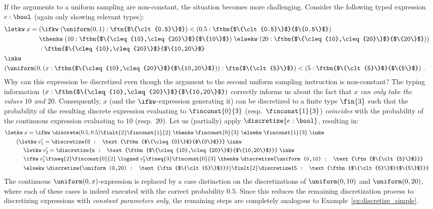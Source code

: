 %
\begin{example}
	If the arguments to a uniform sampling are non-constant, the situation becomes more challenging. Consider the following typed expression $e : \bool$ (again only showing relevant types):
	\begin{align*}
		&\letkw\; x =  (\ifkw \; 
		(\uniform(0, 1) : \text{\ftn{$\{\clt{0.5}\}$}} )
		< (0.5 :\text{\ftbn{$\{\clt{0.5}\}$}{$\{0.5\}$}}) \; \\
		&\phantom{\letkw\; x ={} } \thenkw \; (10 : \text{\ftbn{$\{\cleq{10},\cleq{20}\}$}{$\{10\}$}}) \; 
		\elsekw \; (20 : \text{\ftbn{$\{\cleq{10},\cleq{20}\}$}{$\{20\}$}})) \\
		&\phantom{\letkw\; x ={} } : \text{\ftbn{$\{\cleq{10},\cleq{20}\}$}{$\{10,20\}$}} \\
		&\inkw\; \\
		&(\uniform(0,(x :  \text{\ftbn{$\{\cleq{10},\cleq{20}\}$}{$\{10,20\}$}})) : \text{\ftn{$\{\clt{5}\}$}} ) < (5 :\text{\ftbn{$\{\clt{5}\}$}{$\{5\}$}})~.
	\end{align*}	
	Why can this expression be discretized even though the argument to the second uniform sampling instruction is non-constant? The typing information $(x :  \text{\ftbn{$\{\cleq{10},\cleq{20}\}$}{$\{10,20\}$}})$ correctly informs us about the fact that \emph{$x$ can only take the values $10$ and $20$}. Consequently, $x$ (and the $\ifkw$-expression generating it) can be discretized to a finite type $\fin{3}$ such that the probability of the resulting discrete expression evaluating to $\finconst{0}{3}$ (resp.\ $\finconst{1}{3}$) \emph{coincides} with the probability of the continuous expression evaluating to $10$ (resp.\ $20$). Let us (partially) apply $\discretize{e: \bool}$, resulting in:
	\begin{align*}
		&\letkw \; x = \ifkw\; \discrete(0.5,0.5) \finlt{2} \finconst{1}{2} \; \thenkw \; \finconst{0}{3} \; \elsekw \; \finconst{1}{3} \; \inkw \\
		&\qquad \big(\letkw \; v_1' = \discretize{0 : \text{\ftbn{$\{\cleq{0}\}$}{$\{0\}$}}} \; \inkw \\
		&\qquad\quad\; \letkw \; v_2' = \discretize{x : \text{\ftbn{$\{\cleq{10},\cleq{20}\}$}{$\{10,20\}$}}} \; \inkw \\
		&\qquad\quad\; \ifkw\; v_1' \fineq{2} \finconst{0}{2} \; \logand \; v_2' \fineq{3} \finconst{0}{3} \; \thenkw \; \discretize{\uniform(0,10) : \text{\ftn{$\{\clt{5}\}$}}} \\
		&\qquad\quad\; \elsekw \; \discretize{\uniform(0,20) : \text{\ftn{$\{\clt{5}\}$}}} \big) \finlt{2} \discretize{5 : \text{\ftbn{$\{\clt{5}\}$}{$\{5\}$}}}
	\end{align*}	
	The continuous $\uniform(0,x)$-expression is replaced by a case distinction on the discretizations of $\uniform(0,10)$ and $\uniform(0,20)$, where each of these cases is indeed executed with the correct probability $0.5$. Since this reduces the remaining discretization process to discretizing expressions with \emph{constant parameters only}, the remaining steps are completely analogous to Example~\ref{ex:discretize_simple}.
\end{example}

